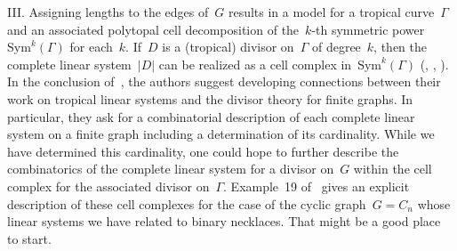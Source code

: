 \documentclass{amsart}
\begin{document}
\noindent III. Assigning lengths to the edges of~$G$ results in a model for a
tropical curve~$\Gamma$ and an associated polytopal cell decomposition of
the~$k$-th symmetric power~$\mathrm{Sym}^k(\Gamma)$ for each~$k$.  If~$D$ is a
(tropical) divisor on~$\Gamma$ of degree~$k$, then the complete linear
system~$|D|$ can be realized as a cell complex in~$\mathrm{Sym}^k(\Gamma)$
(\cite{Gathmann}, \cite{Haase}, \cite{Mikhalkin}).  In the conclusion  of~\cite{Haase},
the authors suggest developing connections between their work on tropical linear
systems and the divisor theory for finite graphs. In particular, they ask for a
combinatorial description of each complete linear system on a finite graph
including a determination of its cardinality.  While we have determined this
cardinality, one could hope to further describe the combinatorics of the
complete linear system for a divisor on~$G$ within the cell complex for the
associated divisor on~$\Gamma$. Example~19 of~\cite{Haase} gives an explicit
description of these cell complexes for the case of the cyclic graph~$G=C_n$
whose linear systems we have related to binary necklaces.  That might be a good
place to start.  

 

\end{document}
